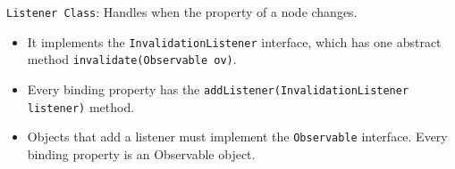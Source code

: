 \documentclass{article}
\begin{document}
\newpage

\texttt{Listener Class}: Handles when the property of a node changes.
\begin{itemize}
	\item It implements the \texttt{InvalidationListener} interface, which has one abstract method \texttt{invalidate(Observable ov)}.
	\item Every binding property has the \texttt{addListener(InvalidationListener listener)} method.
	\item Objects that add a listener must implement the \texttt{Observable} interface. Every binding property is an Observable object.
\end{itemize}
\end{document}
